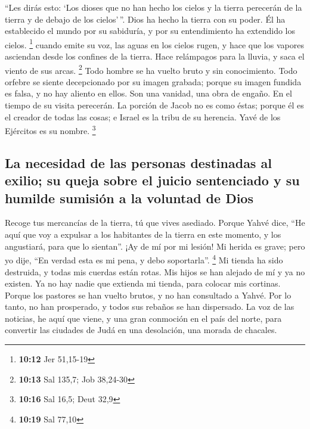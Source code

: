  ``Les dirás esto: `Los dioses que no han hecho los
cielos y la tierra perecerán de la tierra y de debajo de los
cielos'\,''.  Dios ha hecho la tierra con su poder. Él ha
establecido el mundo por su sabiduría, y por su entendimiento ha
extendido los cielos. \footnote{\textbf{10:12} Jer 51,15-19}
 cuando emite su voz, las aguas en los cielos rugen, y
hace que los vapores asciendan desde los confines de la tierra. Hace
relámpagos para la lluvia, y saca el viento de sus arcas. \footnote{\textbf{10:13}
  Sal 135,7; Job 38,24-30}  Todo hombre se ha vuelto
bruto y sin conocimiento. Todo orfebre se siente decepcionado por su
imagen grabada; porque su imagen fundida es falsa, y no hay aliento en
ellos.  Son una vanidad, una obra de engaño. En el tiempo
de su visita perecerán.  La porción de Jacob no es como
éstas; porque él es el creador de todas las cosas; e Israel es la tribu
de su herencia. Yavé de los Ejércitos es su nombre. \footnote{\textbf{10:16}
  Sal 16,5; Deut 32,9}

\hypertarget{la-necesidad-de-las-personas-destinadas-al-exilio-su-queja-sobre-el-juicio-sentenciado-y-su-humilde-sumisiuxf3n-a-la-voluntad-de-dios}{%
\subsection{La necesidad de las personas destinadas al exilio; su queja
sobre el juicio sentenciado y su humilde sumisión a la voluntad de
Dios}\label{la-necesidad-de-las-personas-destinadas-al-exilio-su-queja-sobre-el-juicio-sentenciado-y-su-humilde-sumisiuxf3n-a-la-voluntad-de-dios}}

 Recoge tus mercancías de la tierra, tú que vives
asediado.  Porque Yahvé dice, ``He aquí que voy a
expulsar a los habitantes de la tierra en este momento, y los
angustiará, para que lo sientan''.  ¡Ay de mí por mi
lesión! Mi herida es grave; pero yo dije, ``En verdad esta es mi pena, y
debo soportarla''. \footnote{\textbf{10:19} Sal 77,10} 
Mi tienda ha sido destruida, y todas mis cuerdas están rotas. Mis hijos
se han alejado de mí y ya no existen. Ya no hay nadie que extienda mi
tienda, para colocar mis cortinas.  Porque los pastores
se han vuelto brutos, y no han consultado a Yahvé. Por lo tanto, no han
prosperado, y todos sus rebaños se han dispersado.  La
voz de las noticias, he aquí que viene, y una gran conmoción en el país
del norte, para convertir las ciudades de Judá en una desolación, una
morada de chacales.

